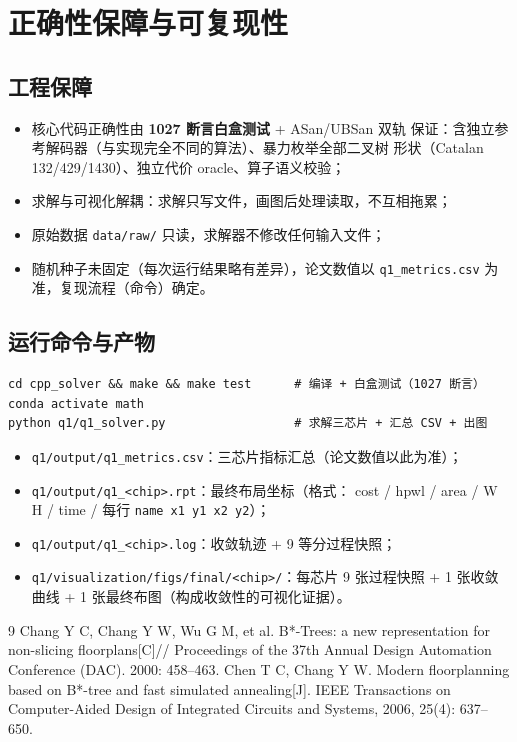 \documentclass[12pt,a4paper]{article}
\begin{document}
\section{正确性保障与可复现性}

\subsection{工程保障}

\begin{itemize}
    \item 核心代码正确性由 \textbf{1027 断言白盒测试} + ASan/UBSan 双轨
    保证：含独立参考解码器（与实现完全不同的算法）、暴力枚举全部二叉树
    形状（Catalan 132/429/1430）、独立代价 oracle、算子语义校验；
    \item 求解与可视化解耦：求解只写文件，画图后处理读取，不互相拖累；
    \item 原始数据 \texttt{data/raw/} 只读，求解器不修改任何输入文件；
    \item 随机种子未固定（每次运行结果略有差异），论文数值以
    \texttt{q1\_metrics.csv} 为准，复现流程（命令）确定。
\end{itemize}

\subsection{运行命令与产物}

{\small
\begin{verbatim}
cd cpp_solver && make && make test      # 编译 + 白盒测试（1027 断言）
conda activate math
python q1/q1_solver.py                  # 求解三芯片 + 汇总 CSV + 出图
\end{verbatim}
}

\begin{itemize}
    \item \texttt{q1/output/q1\_metrics.csv}：三芯片指标汇总（论文数值以此为准）；
    \item \texttt{q1/output/q1\_<chip>.rpt}：最终布局坐标（格式：
    cost / hpwl / area / W H / time / 每行 \texttt{name x1 y1 x2 y2}）；
    \item \texttt{q1/output/q1\_<chip>.log}：收敛轨迹 + 9 等分过程快照；
    \item \texttt{q1/visualization/figs/final/<chip>/}：每芯片
    9 张过程快照 + 1 张收敛曲线 + 1 张最终布图（构成收敛性的可视化证据）。
\end{itemize}

\begin{thebibliography}{9}
 Chang Y C, Chang Y W, Wu G M, et al. B*-Trees: a new
  representation for non-slicing floorplans[C]// Proceedings of the 37th
  Annual Design Automation Conference (DAC). 2000: 458--463.
 Chen T C, Chang Y W. Modern floorplanning based on B*-tree
  and fast simulated annealing[J]. IEEE Transactions on Computer-Aided
  Design of Integrated Circuits and Systems, 2006, 25(4): 637--650.
\end{thebibliography}
\end{document}
